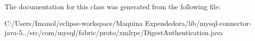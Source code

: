 The documentation for this class was generated from the following file\+:\begin{DoxyCompactItemize}
\item 
C\+:/\+Users/\+Imanol/eclipse-\/workspace/\+Maquina Expendedora/lib/mysql-\/connector-\/java-\/5../src/com/mysql/fabric/proto/xmlrpc/Digest\+Authentication.\+java\end{DoxyCompactItemize}
